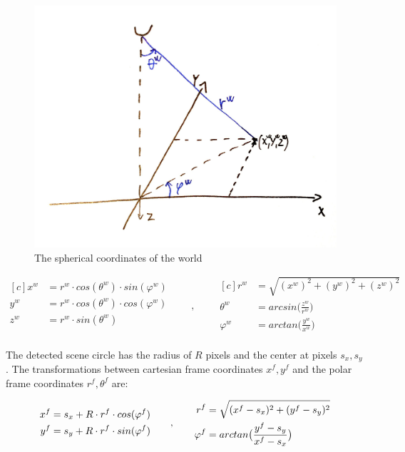 \documentclass[a4paper,12pt,titlepage, twoside]{article}
\numberwithin{figure}{section}
\begin{document}
\begin{figure}[h]
\centering
\includegraphics[width=1\linewidth]{fig/sphere.jpg}
\caption{The spherical coordinates of the world}
\label{fig:sphere}
\end{figure}


\begin{equation*}
\begin{aligned}[c]
x^w &= r^w \cdot cos(\theta^w) \cdot sin(\varphi^w) \\
y^w &= r^w \cdot cos(\theta^w) \cdot cos(\varphi^w) \\
z^w &= r^w \cdot sin(\theta^w) \\
\end{aligned}
\qquad,\qquad
\begin{aligned}[c]
r^w &= \sqrt{(x^w)^2 + (y^w)^2 + (z^w)^2} \\
\theta^w &= arcsin\Big(\frac{z^w}{r^w}\Big) \\
\varphi^w &= arctan\Big(\frac{y^w}{x^w}\Big) \\
\end{aligned}
\end{equation*}



The detected scene circle has the radius of $R$ pixels and the center at pixels $s_x, s_y$. The transformations between cartesian frame coordinates $x^f, y^f$ and the polar frame coordinates $r^f, \theta^f$ are:

\begin{equation*}
\begin{aligned}[c]
x^f &= s_x + R \cdot r^f \cdot cos(\varphi^f) \\
y^f &= s_y + R \cdot r^f \cdot sin(\varphi^f) \\
\end{aligned}
\qquad,\qquad
\begin{aligned}[c]
r^f &= \sqrt{(x^f - s_x)^2 + (y^f - s_y)^2} \\
\varphi^f &= arctan\big{(}\frac{y^f - s_y}{x^f - s_x}\big{)}
\end{aligned}
\end{equation*}
\end{document}
